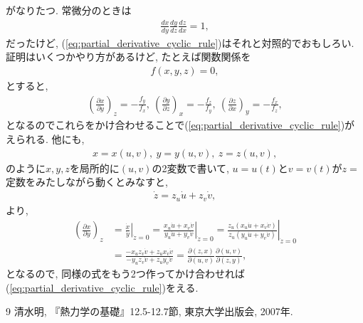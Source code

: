 \documentclass{ltjsarticle}
\theoremstyle{definition}
\newcommand{\parno}{\par\noindent}
\begin{document}
\parno
がなりたつ. 常微分のときは
\begin{gather}
  \frac{dx}{dy}\frac{dy}{dz}\frac{dz}{dx}=1,
\end{gather}
だったけど, (\ref{eq:partial_derivative_cyclic_rule})はそれと対照的でおもしろい. 証明はいくつかやり方があるけど, たとえば関数関係を
\begin{gather}
  f(x,y,z)=0,
\end{gather}
とすると,
\begin{gather}
  \left(\frac{\partial x}{\partial y}\right)_z=-\frac{f_y}{f_x},\ \left(\frac{\partial y}{\partial z}\right)_x=-\frac{f_z}{f_y},\ \left(\frac{\partial z}{\partial x}\right)_y=-\frac{f_x}{f_z},
\end{gather}
となるのでこれらをかけ合わせることで(\ref{eq:partial_derivative_cyclic_rule})がえられる. 他にも,
\begin{gather}
  x=x(u,v),\ y=y(u,v),\ z=z(u,v),
\end{gather}
のように$x,y,z$を局所的に$(u,v)$の2変数で書いて, $u=u(t)$と$v=v(t)$が$z=$定数をみたしながら動くとみなすと,
\begin{gather}
  \dot z=z_u\dot u+z_v\dot v,
\end{gather}
より,
\begin{align}
  \left(\frac{\partial x}{\partial y}\right)_z&=\left.\frac{\dot x}{\dot y}\right|_{\dot z=0}=\left.\frac{x_u\dot u+x_v\dot v}{y_u\dot u+y_v\dot v}\right|_{\dot z=0}=\left.\frac{z_u\left(x_u\dot u+x_v\dot v\right)}{z_u\left(y_u\dot u+y_v\dot v\right)}\right|_{\dot z=0}\\
  &=\frac{-x_uz_v\dot v+z_ux_v\dot v}{-y_uz_v\dot v+z_uy_v\dot v}=\frac{\partial(z,x)}{\partial(u,v)}\frac{\partial(u,v)}{\partial(z,y)},
\end{align}
となるので, 同様の式をもう2つ作ってかけ合わせれば(\ref{eq:partial_derivative_cyclic_rule})をえる.

\begin{thebibliography}{9}
  \bibitem{} 清水明, 『熱力学の基礎』12.5-12.7節, 東京大学出版会, 2007年.
\end{thebibliography}
\end{document}

